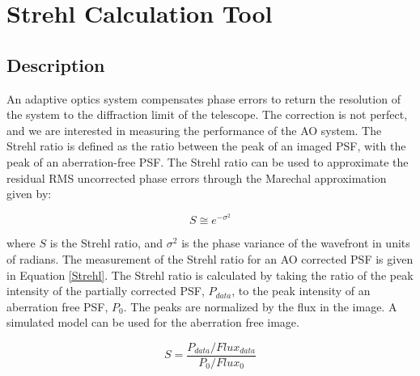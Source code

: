 \chapter{Strehl Calculation Tool}

\section{Description}

An adaptive optics system compensates phase errors to return the resolution of the system to the diffraction limit of the telescope. The correction is not perfect, and we are interested in measuring the performance of the AO system. The Strehl ratio is defined as the ratio between the peak of an imaged PSF, with the peak of an aberration-free PSF. The Strehl ratio can be used to approximate the residual RMS uncorrected phase errors through the Marechal approximation given by:

\begin{equation}
    S \cong e^{-\sigma^2}
\end{equation}

where $S$ is the Strehl ratio, and $\sigma^2$ is the phase variance of the wavefront in units of radians. The measurement of the Strehl ratio for an AO corrected PSF is given in Equation \ref{Strehl}. The Strehl ratio is calculated by taking the ratio of the peak intensity of the partially corrected PSF, $P_{data}$,  to the peak intensity of an aberration free PSF, $P_0$. The peaks are normalized by the flux in the image. A simulated model can be used for the aberration free image. 

\begin{equation}
    S=\frac{P_{data}/Flux_{data}}{P_{0}/Flux_{0}}
    \label{Strehl}
\end{equation}

